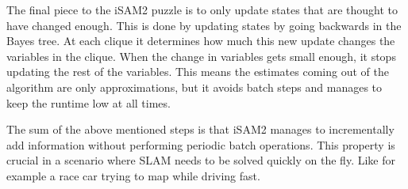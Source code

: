 The final piece to the \gls{iSAM2} puzzle is to only update states that are thought to have changed enough. This is done by updating states by going backwards in the Bayes tree. At each clique it determines how much this new update changes the variables in the clique. When the change in variables gets small enough, it stops updating the rest of the variables. This means the estimates coming out of the algorithm are only approximations, but it avoids batch steps and manages to keep the runtime low at all times.

The sum of the above mentioned steps is that \gls{iSAM2} manages to incrementally add information without performing periodic batch operations. This property is crucial in a scenario where SLAM needs to be solved quickly on the fly. Like for example a race car trying to map while driving fast.